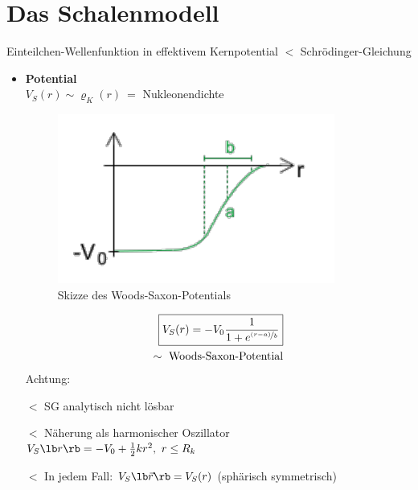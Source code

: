 \section{Das Schalenmodell}
Einteilchen-Wellenfunktion in effektivem Kernpotential $\lt$ Schrödinger-Gleichung
\begin{itemize}
\item \textbf{Potential}\\
$V_S (r) \sim \varrho_K (r) \ =$ Nukleonendichte
\begin{figure}[!ht]
\centering
\includegraphics[width=.5\textwidth]{imgs/ep5-fig-4-11.pdf}
\caption{Skizze des Woods-Saxon-Potentials \label{fig:4.11}}
\end{figure}
\begin{align}
\boxed{
V_S(r) = -V_0 \frac{1}{1+e^{\nicefrac{(r-a)}{b}}}
}\\
\sim \text{ Woods-Saxon-Potential}\nonumber
\end{align}
Achtung:
\item[$\lt$] SG analytisch nicht lösbar
\item[$\lt$] Näherung als harmonischer Oszillator\\
$V_S\lb r\rb  = -V_0 + \frac{1}{2}kr^2, \ r \leq R_k$
\item[$\lt$] In jedem Fall: $V_S\lb  \vec{r}\rb  = V_S(r)$ (sphärisch symmetrisch)
\end{itemize}
